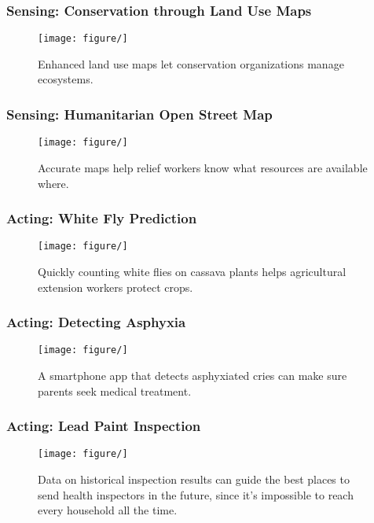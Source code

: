 \documentclass[10pt,mathserif]{beamer}
\begin{document}
\begin{frame}
  \frametitle{Sensing: Conservation through Land Use Maps}
  \begin{figure}[ht]
    \centering
    \texttt{[image: figure/]}
    \caption{Enhanced land use maps let conservation organizations manage
      ecosystems. \label{fig:land_use} }
  \end{figure}
\end{frame}

\begin{frame}
  \frametitle{Sensing: Humanitarian Open Street Map}
  \begin{figure}[ht]
    \centering
    \texttt{[image: figure/]}
    \caption{Accurate maps help relief workers know what resources are available
      where. \label{fig:hotsm} }
  \end{figure}
\end{frame}

\begin{frame}
  \frametitle{Acting: White Fly Prediction}
  \begin{figure}[ht]
    \centering
    \texttt{[image: figure/]}
    \caption{Quickly counting white flies on cassava plants helps agricultural
      extension workers protect crops. \label{fig:whitefly} }
  \end{figure}
\end{frame}

\begin{frame}
  \frametitle{Acting: Detecting Asphyxia}
  \begin{figure}[ht]
    \centering
    \texttt{[image: figure/]}
    \caption{A smartphone app that detects asphyxiated cries can make sure
      parents seek medical treatment.
      \label{fig:asphyx} }
  \end{figure}
\end{frame}

\begin{frame}
  \frametitle{Acting: Lead Paint Inspection}
  \begin{figure}[ht]
    \centering
    \texttt{[image: figure/]}
    \caption{Data on historical inspection results can guide the best places to
      send health inspectors in the future, since it's impossible to reach every
      household all the time.
      \label{fig:lead_paint} }
  \end{figure}
\end{frame}
\end{document}
